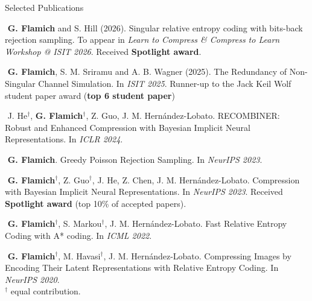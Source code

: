 \documentclass{resume} %
\begin{document}

\begin{rSection}{Selected Publications}\setlength\itemsep{-0.5em} \itemsep -6pt
\item \textbullet\,\,\textbf{G. Flamich} and S. Hill (2026).
  Singular relative entropy coding with bits-back rejection sampling. To appear
  in \textit{Learn to Compress \& Compress to Learn Workshop @ ISIT 2026}.
  Received \textbf{Spotlight award}.
\item \textbullet\,\,\textbf{G. Flamich}, S. M. Sriramu and A. B. Wagner (2025). The
  Redundancy of Non-Singular Channel Simulation. In \textit{ISIT 2025}.
  Runner-up to the Jack Keil Wolf student paper award (\textbf{top 6 student paper})
\item \textbullet\,\,J. He$^\dagger$, \textbf{G. Flamich}$^\dagger$, Z. Guo, J. M. Hern\'andez-Lobato.
    RECOMBINER: Robust and Enhanced Compression with Bayesian Implicit Neural
    Representations. In \textit{ICLR 2024}.
\item \textbullet\,\,\textbf{G. Flamich}.
    Greedy Poisson Rejection Sampling. In \textit{NeurIPS 2023}.
  \item \textbullet\,\,\textbf{G. Flamich}$^\dagger$, Z. Guo$^\dagger$, J. He, Z. Chen, J. M. Hern\'andez-Lobato.
  Compression with Bayesian Implicit Neural Representations. In \textit{NeurIPS
    2023}. Received \textbf{Spotlight award} (top 10\% of accepted papers).
\item \textbullet\,\,\textbf{G. Flamich}$^\dagger$, S. Markou$^\dagger$, J. M. Hern\'andez-Lobato.
    Fast Relative Entropy Coding with A* coding. In \textit{ICML 2022}.
  \item \textbullet\,\,\textbf{G. Flamich}$^\dagger$, M. Havasi$^\dagger$, J. M. Hern\'andez-Lobato.
    Compressing Images by Encoding Their Latent Representations with Relative
    Entropy Coding. In \textit{NeurIPS 2020}.
    \\
    $^\dagger$ equal contribution.
\end{rSection}
\end{document}
